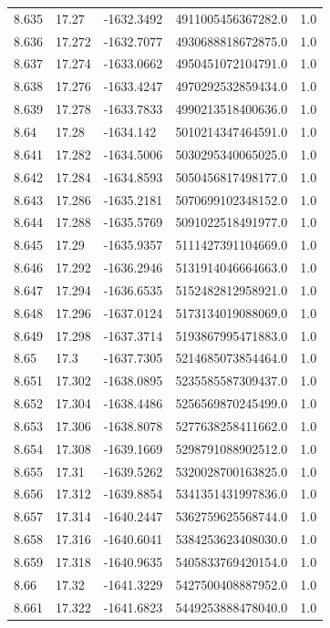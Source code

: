 \begin{tabular}{lllll}
8.635 & 17.27 & -1632.3492 & 4911005456367282.0 & 1.0 \\
8.636 & 17.272 & -1632.7077 & 4930688818672875.0 & 1.0 \\
8.637 & 17.274 & -1633.0662 & 4950451072104791.0 & 1.0 \\
8.638 & 17.276 & -1633.4247 & 4970292532859434.0 & 1.0 \\
8.639 & 17.278 & -1633.7833 & 4990213518400636.0 & 1.0 \\
8.64 & 17.28 & -1634.142 & 5010214347464591.0 & 1.0 \\
8.641 & 17.282 & -1634.5006 & 5030295340065025.0 & 1.0 \\
8.642 & 17.284 & -1634.8593 & 5050456817498177.0 & 1.0 \\
8.643 & 17.286 & -1635.2181 & 5070699102348152.0 & 1.0 \\
8.644 & 17.288 & -1635.5769 & 5091022518491977.0 & 1.0 \\
8.645 & 17.29 & -1635.9357 & 5111427391104669.0 & 1.0 \\
8.646 & 17.292 & -1636.2946 & 5131914046664663.0 & 1.0 \\
8.647 & 17.294 & -1636.6535 & 5152482812958921.0 & 1.0 \\
8.648 & 17.296 & -1637.0124 & 5173134019088069.0 & 1.0 \\
8.649 & 17.298 & -1637.3714 & 5193867995471883.0 & 1.0 \\
8.65 & 17.3 & -1637.7305 & 5214685073854464.0 & 1.0 \\
8.651 & 17.302 & -1638.0895 & 5235585587309437.0 & 1.0 \\
8.652 & 17.304 & -1638.4486 & 5256569870245499.0 & 1.0 \\
8.653 & 17.306 & -1638.8078 & 5277638258411662.0 & 1.0 \\
8.654 & 17.308 & -1639.1669 & 5298791088902512.0 & 1.0 \\
8.655 & 17.31 & -1639.5262 & 5320028700163825.0 & 1.0 \\
8.656 & 17.312 & -1639.8854 & 5341351431997836.0 & 1.0 \\
8.657 & 17.314 & -1640.2447 & 5362759625568744.0 & 1.0 \\
8.658 & 17.316 & -1640.6041 & 5384253623408030.0 & 1.0 \\
8.659 & 17.318 & -1640.9635 & 5405833769420154.0 & 1.0 \\
8.66 & 17.32 & -1641.3229 & 5427500408887952.0 & 1.0 \\
8.661 & 17.322 & -1641.6823 & 5449253888478040.0 & 1.0 \\

\end{tabular}
